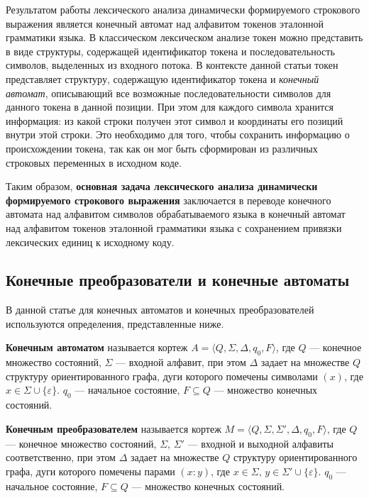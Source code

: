 \documentclass[10pt, conference, compsocconf]{IEEEtran}
\begin{document}
Результатом работы лексического анализа динамически формируемого строкового выражения является конечный автомат над алфавитом токенов эталонной грамматики языка. В классическом лексическом анализе токен можно представить в виде структуры, содержащей идентификатор токена и последовательность символов, выделенных из входного потока. В контексте данной статьи токен представляет структуру, содержащую идентификатор токена и \textit{конечный автомат}, описывающий все возможные последовательности символов для данного токена в данной позиции. При этом для каждого символа хранится информация: из какой строки получен этот символ и координаты его позиций внутри этой строки. Это необходимо для того, чтобы сохранить информацию о происхождении токена, так как он мог быть сформирован из различных строковых переменных в исходном коде.

Таким образом, \textbf{основная задача лексического анализа динамически формируемого строкового выражения} заключается в переводе конечного автомата над алфавитом символов обрабатываемого языка в конечный автомат над алфавитом токенов эталонной грамматики языка с сохранением привязки лексических единиц к исходному коду.

\subsection{Конечные преобразователи и конечные автоматы}

В данной статье для конечных автоматов и конечных преобразователей используются определения, представленные ниже. 

\textbf{Конечным автоматом} называется кортеж $A = \langle Q, \Sigma, \Delta, q_0, F \rangle$, где $Q$ --- конечное множество состояний, $\Sigma$ --- входной алфавит, при этом $\Delta$ задает на множестве $Q$ структуру ориентированного графа, дуги которого помечены символами $(x)$, где $x \in \Sigma \cup \{\varepsilon \}$. $q_0$ ---  начальное состояние, $F \subseteq Q$ --- множество конечных состояний. 

\textbf{Конечным преобразователем} называется кортеж $M = \langle Q, \Sigma, \Sigma', \Delta, q_0, F \rangle$, где $Q$ --- конечное множество состояний, $\Sigma$, $\Sigma'$ --- входной и выходной алфавиты соответственно, при этом $\Delta$ задает на множестве $Q$ структуру ориентированного графа, дуги которого помечены парами $(x : y)$, где $x \in \Sigma$, $y \in \Sigma' \cup \{\varepsilon \}$. $q_0$ --- начальное состояние, $F \subseteq Q$ --- множество конечных состояний. 
\end{document}
